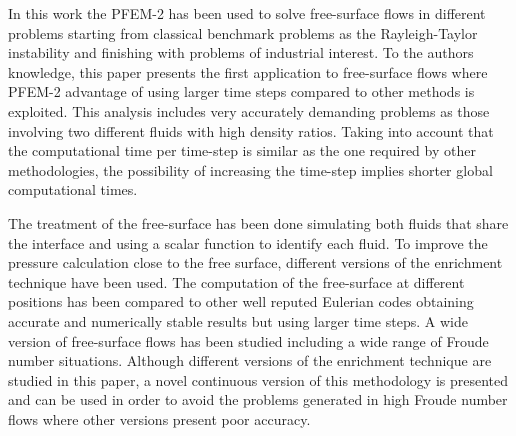 In this work the PFEM-2 has been used to solve free-surface flows in different problems starting from classical benchmark problems as the Rayleigh-Taylor instability and finishing with problems of industrial interest. To the authors knowledge, this paper presents the first application to free-surface flows where PFEM-2 advantage of using larger time steps compared to other methods is exploited. This analysis includes very accurately demanding problems as those involving two different fluids with high density ratios. Taking into account that the computational time per time-step is similar as the one required by other methodologies, the possibility of increasing the time-step implies shorter global computational times.

The treatment of the free-surface has been done simulating both fluids that share the interface and using a scalar function to identify each fluid. To improve the pressure calculation close to the free surface, different versions of the enrichment technique \cite{Coppola05} have been used. The computation of the free-surface at different positions has been compared to other well reputed Eulerian codes obtaining accurate and numerically stable results but using larger time steps. A wide version of free-surface flows has been studied including a wide range of Froude number situations. Although different versions of the enrichment technique are studied in this paper, a novel continuous version of this methodology is presented and can be used in order to avoid the problems generated in high Froude number flows where other versions present poor accuracy. 
